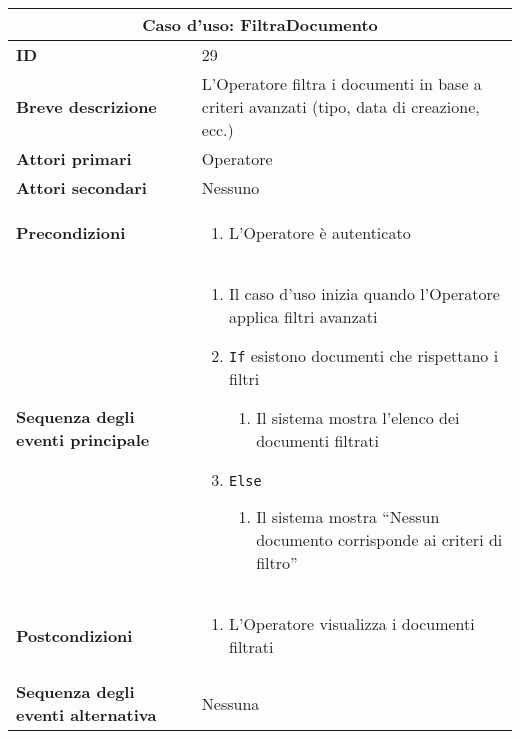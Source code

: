 \documentclass[a4paper]{report}
\begin{document}
\clearpage
\begin{table}[H]
\vspace*{-0cm}
\renewcommand{\arraystretch}{1.9}
\begin{tabular}{|p{3.9cm}|p{9.9cm}|}
\hline
\multicolumn{2}{|c|}{\textbf{Caso d’uso: FiltraDocumento}} \\ \hline
	\textbf{ID} & 29 \\ \hline
	\textbf{Breve descrizione} & L'Operatore filtra i documenti in base a criteri avanzati (tipo, data di creazione, ecc.)  \\ \hline
	\textbf{Attori primari} & Operatore  \\ \hline
	\textbf{Attori secondari} & Nessuno \\ \hline
	\textbf{Precondizioni} & \begin{enumerate}[leftmargin=14pt,label=\arabic*.,labelsep=0.5em,topsep=0pt,partopsep=0pt,parsep=0pt,itemsep=0pt]
        \item L’Operatore è autenticato
    \end{enumerate} \\ \hline
	\textbf{Sequenza degli eventi principale} & 
\begin{enumerate}[leftmargin=14pt,label=\arabic*.,labelsep=0.5em,topsep=0pt,partopsep=0pt,parsep=0pt,itemsep=0pt]
    \item Il caso d’uso inizia quando l’Operatore applica filtri avanzati
    \item \texttt{If} esistono documenti che rispettano i filtri
    \begin{enumerate}[label=\arabic{enumi}.\arabic*.,leftmargin=22pt,labelsep=0.5em,topsep=0pt,partopsep=0pt,parsep=0pt,itemsep=0pt]
        \item Il sistema mostra l'elenco dei documenti filtrati
    \end{enumerate}
    \item \texttt{Else}
    \begin{enumerate}[label=\arabic{enumi}.\arabic*.,leftmargin=22pt,labelsep=0.5em,topsep=0pt,partopsep=0pt,parsep=0pt,itemsep=0pt]
        \item Il sistema mostra “Nessun documento corrisponde ai criteri di filtro”
    \end{enumerate}
\end{enumerate}\\ \hline
	\textbf{Postcondizioni} & \begin{enumerate}[label=\arabic*.,leftmargin=14pt,labelsep=0.5em,topsep=0pt,partopsep=0pt,parsep=0pt,itemsep=0pt]
        \item L’Operatore visualizza i documenti filtrati
    \end{enumerate} \\ \hline
	\textbf{Sequenza degli eventi alternativa} & Nessuna \\ \hline
\end{tabular}
\end{table}
\end{document}
